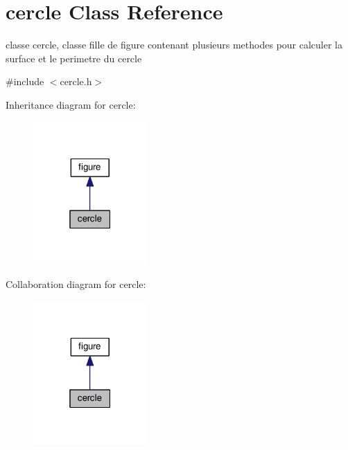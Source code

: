 \hypertarget{classcercle}{}\section{cercle Class Reference}
\label{classcercle}


classe cercle, classe fille de figure contenant plusieurs methodes pour calculer la surface et le perimetre du cercle  




{\ttfamily \#include $<$cercle.\+h$>$}



Inheritance diagram for cercle\+:\nopagebreak
\begin{figure}[H]
\begin{center}
\leavevmode
\includegraphics[width=123pt]{classcercle__inherit__graph}
\end{center}
\end{figure}


Collaboration diagram for cercle\+:\nopagebreak
\begin{figure}[H]
\begin{center}
\leavevmode
\includegraphics[width=123pt]{classcercle__coll__graph}
\end{center}
\end{figure}
